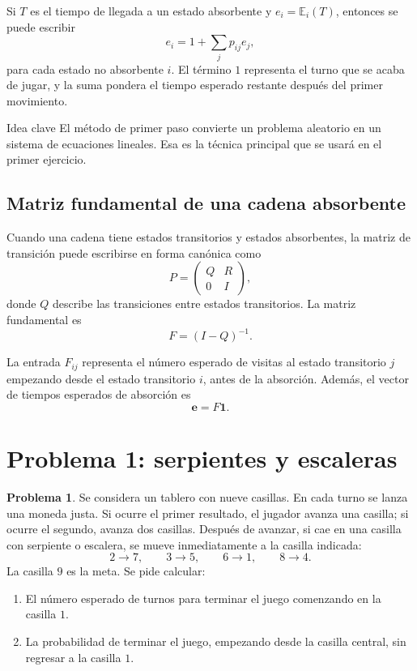 \documentclass[12pt,a4paper]{article}
\newcommand{\E}{\mathbb{E}}
\theoremstyle{definition}
\newtheorem{problema}{Problema}
\begin{document}
Si \(T\) es el tiempo de llegada a un estado absorbente y \(e_i=\E_i(T)\), entonces se puede escribir
\[
    e_i=1+\sum_j p_{ij}e_j,
\]
para cada estado no absorbente \(i\). El término \(1\) representa el turno que se acaba de jugar, y la suma pondera el tiempo esperado restante después del primer movimiento.

\begin{cajaIdea}{Idea clave}
El método de primer paso convierte un problema aleatorio en un sistema de ecuaciones lineales. Esa es la técnica principal que se usará en el primer ejercicio.
\end{cajaIdea}

\subsection{Matriz fundamental de una cadena absorbente}

Cuando una cadena tiene estados transitorios y estados absorbentes, la matriz de transición puede escribirse en forma canónica como
\[
    P=\begin{pmatrix}
        Q & R\\
        0 & I
    \end{pmatrix},
\]
donde \(Q\) describe las transiciones entre estados transitorios. La matriz fundamental es
\[
    F=(I-Q)^{-1}.
\]

La entrada \(F_{ij}\) representa el número esperado de visitas al estado transitorio \(j\) empezando desde el estado transitorio \(i\), antes de la absorción. Además, el vector de tiempos esperados de absorción es
\[
    \mathbf{e}=F\mathbf{1}.
\]

\section{Problema 1: serpientes y escaleras}

\begin{problema}
Se considera un tablero con nueve casillas. En cada turno se lanza una moneda justa. Si ocurre el primer resultado, el jugador avanza una casilla; si ocurre el segundo, avanza dos casillas. Después de avanzar, si cae en una casilla con serpiente o escalera, se mueve inmediatamente a la casilla indicada:
\[
    2\longrightarrow 7,\qquad
    3\longrightarrow 5,\qquad
    6\longrightarrow 1,\qquad
    8\longrightarrow 4.
\]
La casilla \(9\) es la meta. Se pide calcular:
\begin{enumerate}[label=\textbf{\alph*)},leftmargin=1.2cm]
    \item El número esperado de turnos para terminar el juego comenzando en la casilla \(1\).
    \item La probabilidad de terminar el juego, empezando desde la casilla central, sin regresar a la casilla \(1\).
\end{enumerate}
\end{problema}
\end{document}
